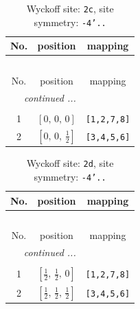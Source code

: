 \documentclass[fleqn,8pt]{jsarticle}
\begin{document}
\renewcommand{\arraystretch}{1.2}
\begin{longtable}{ccc}
\caption{Wyckoff site: {\tt 2c}, site symmetry: {\tt -4'..}}
 \\
 \hline \hline
No. & position & mapping \\ \hline \endfirsthead

\multicolumn{2}{l}{\tablename\ \thetable{}} \\
 \hline \hline
No. & position & mapping \\ \hline \endhead

 \hline \hline
\multicolumn{2}{r}{\footnotesize\it continued ...} \\ \endfoot

 \hline \hline
\multicolumn{2}{r}{} \\ \endlastfoot

1 & $\left[ 0,\, 0,\, 0 \right]$ & {\tt [1,2,7,8]} \\ \hline
2 & $\left[ 0,\, 0,\, \frac{1}{2} \right]$ & {\tt [3,4,5,6]} \\
\end{longtable}
\renewcommand{\arraystretch}{1.2}
\begin{longtable}{ccc}
\caption{Wyckoff site: {\tt 2d}, site symmetry: {\tt -4'..}}
 \\
 \hline \hline
No. & position & mapping \\ \hline \endfirsthead

\multicolumn{2}{l}{\tablename\ \thetable{}} \\
 \hline \hline
No. & position & mapping \\ \hline \endhead

 \hline \hline
\multicolumn{2}{r}{\footnotesize\it continued ...} \\ \endfoot

 \hline \hline
\multicolumn{2}{r}{} \\ \endlastfoot

1 & $\left[ \frac{1}{2},\, \frac{1}{2},\, 0 \right]$ & {\tt [1,2,7,8]} \\ \hline
2 & $\left[ \frac{1}{2},\, \frac{1}{2},\, \frac{1}{2} \right]$ & {\tt [3,4,5,6]} \\
\end{longtable}
\renewcommand{\arraystretch}{1.2}
\end{document}
